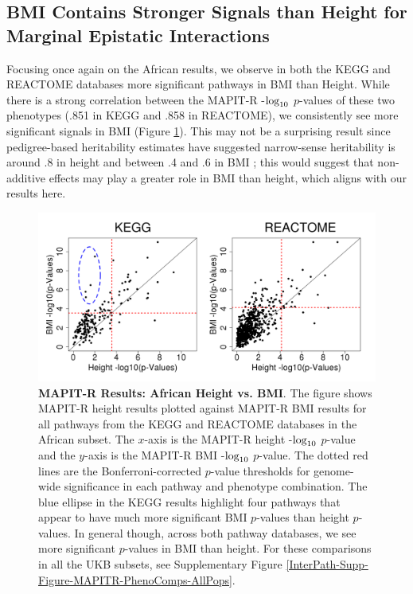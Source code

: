 \documentclass[12pt,a4paper]{article}
\def\log{{\rm log}}
\begin{document}
\subsection{BMI Contains Stronger Signals than Height for Marginal Epistatic Interactions}

Focusing once again on the African results, we observe in both the KEGG and REACTOME databases more significant pathways in BMI than Height. While there is a strong correlation between the MAPIT-R -$\log_{10}$ $p$-values of these two phenotypes (.851 in KEGG and .858 in REACTOME), we consistently see more significant signals in BMI (Figure \ref{InterPath-Main-Figure-MAPITR-PhenoComps-African}). This may not be a surprising result since pedigree-based heritability estimates have suggested narrow-sense heritability is around .8 in height and between .4 and .6 in BMI \citep{Elks2012,Visscher2012}; this would suggest that non-additive effects may play a greater role in BMI than height, which aligns with our results here. 

\begin{figure}[htb]
\centering
\includegraphics[scale=.45]{Images/Main/InterPath_Main_Figure_MAPITR_PhenoComps_African_vs2.png}
\caption[TBD]{\textbf{MAPIT-R Results: African Height vs. BMI}. The figure shows MAPIT-R height results plotted against MAPIT-R BMI results for all pathways from the KEGG and REACTOME databases in the African subset. The $x$-axis is the MAPIT-R height -$\log_{10}$ $p$-value and the $y$-axis is the MAPIT-R BMI -$\log_{10}$ $p$-value. The dotted red lines are the Bonferroni-corrected $p$-value thresholds for genome-wide significance in each pathway and phenotype combination. The blue ellipse in the KEGG results highlight four pathways that appear to have much more significant BMI $p$-values than height $p$-values. In general though, across both pathway databases, we see more significant $p$-values in BMI than height. For these comparisons in all the UKB subsets, see Supplementary Figure \ref{InterPath-Supp-Figure-MAPITR-PhenoComps-AllPops}.}
\label{InterPath-Main-Figure-MAPITR-PhenoComps-African}
\end{figure}
\end{document}

